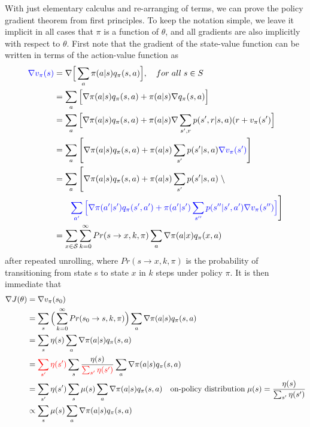 {\begin{tcolorbox}[colbacktitle=black!7!white,coltitle=black!75!white,title=\textbf{Proof of the Policy Gradient Theorem (episodic case)}]
With just elementary calculus and re-arranging of terms, we can prove the policy gradient theorem from first principles. To keep the notation simple, we leave it implicit in all cases that $\pi$ is a function of $\theta$, and all gradients are also implicitly with respect to $\theta$. First note that the gradient of the state-value function can be written in terms of the action-value function as
\begin{align*}
    \textcolor{blue}{\nabla v_\pi(s)}&=\nabla\Big[\sum_a\pi(a|s)q_\pi(s,a)\Big],\quad for\;all\;s\in S\\
    &=\sum_a\Big[\nabla\pi(a|s)q_\pi(s,a)+\pi(a|s)\nabla q_\pi(s,a)\Big]\\
    &=\sum_a\Big[\nabla\pi(a|s)q_\pi(s,a)+\pi(a|s)\nabla\sum_{s',r}p(s',r|s,a)(r+v_\pi(s') \Big]\\
    &=\sum_a\Bigg[\nabla\pi(a|s)q_\pi(s,a)+\pi(a|s)\sum_{s'}p(s'|s,a)\textcolor{blue}{\nabla v_\pi(s')} \Bigg]\\
    &=\sum_a\Bigg[\nabla\pi(a|s)q_\pi(s,a)+\pi(a|s)\sum_{s'}p(s'|s,a) \;\backslash \\
    &\quad\quad\textcolor{blue}{\sum_{a'}\Big[\nabla\pi(a'|s')q_\pi(s',a')+\pi(a'|s')\sum_{s''}p(s''|s',a')\nabla v_\pi(s'')\Big]}\Bigg]\\
    &=\sum_{x\in\mathcal{S}}\sum_{k=0}^{\infty} Pr(s\rightarrow x, k, \pi)\sum_a\nabla\pi(a|x)q_\pi(x,a)
\end{align*}
after repeated unrolling, where $Pr(s\rightarrow x, k, \pi)$ is the probability of transitioning
from state s to state $x$ in $k$ steps under policy $\pi$. It is then immediate that
\begin{align*}
    \nabla J(\theta)&=\nabla v_\pi(s_0)\\
    &=\sum_{s}\Big(\sum_{k=0}^{\infty} Pr(s_0\rightarrow s, k, \pi)\Big)\sum_a\nabla\pi(a|s)q_\pi(s,a)\\
    &=\sum_{s}\eta(s)\sum_a\nabla\pi(a|s)q_\pi(s,a)\\
    &=\textcolor{red}{\sum_{s'}\eta(s')}\sum_{s}\frac{\eta(s)}{\textcolor{red}{\sum_{s'}\eta(s')}}\sum_a\nabla\pi(a|s)q_\pi(s,a)\\
    &=\sum_{s'}\eta(s')\sum_{s}\mu(s)\sum_a\nabla\pi(a|s)q_\pi(s,a)\quad\text{on-policy distribution}\; \mu(s)=\frac{\eta(s)}{\sum_{s'}\eta(s')}\\
    &\propto\sum_{s}\mu(s)\sum_a\nabla\pi(a|s)q_\pi(s,a)
\end{align*}


\end{tcolorbox}}
